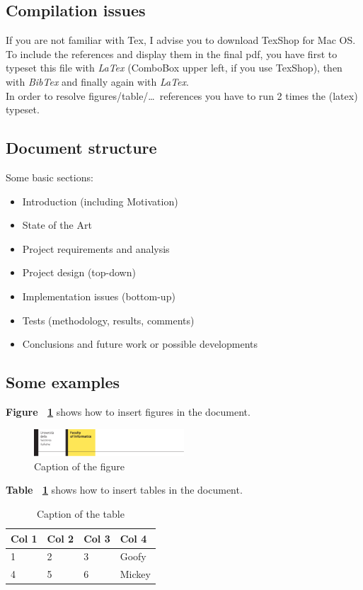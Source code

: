 \documentclass[]{usiinfbachelorproject}
\begin{document}
\subsection {Compilation issues}

If you are not familiar with Tex, I advise you to download TexShop for Mac OS.\\
To include the references and display them in the final pdf, you have first to typeset this file with \textit{LaTex} (ComboBox upper left, if you use TexShop), then with \textit{BibTex} and finally again with \textit{LaTex}.\\
In order to resolve figures/table/\dots~references you have to run 2 times the (latex) typeset.

\subsection {Document structure}

Some basic sections:
\begin{itemize}
\item Introduction (including Motivation)
\item State of the Art
\item Project requirements and analysis
\item Project design (top-down)
\item Implementation issues (bottom-up)
\item Tests (methodology, results, comments)
\item Conclusions and future work or possible developments
\end{itemize} 

\subsection {Some examples}

\textbf{Figure ~\ref{fig:USILogo}} shows how to insert figures in the document.

\begin{figure} [h]
\centering
\includegraphics[width=0.5\textwidth]{logo-info.pdf}
\caption{Caption of the figure}
\label{fig:USILogo}
\end{figure}

\noindent\textbf{Table ~\ref{tab:numbers}} shows how to insert tables in the document.

\begin{table}[h]
\centering
{} {
\begin{normalsize}\begin{tabular}{l|lll}
\textbf{Col 1} & \textbf{Col 2} & \textbf{Col 3} & \textbf{Col 4}\\
\hline
1 & 2 & 3 & Goofy\\
4 & 5 & 6 & Mickey
\end{tabular}
\end{normalsize}
}
\caption{Caption of the table}
\label{tab:numbers}
\end{table}




\end{document}
